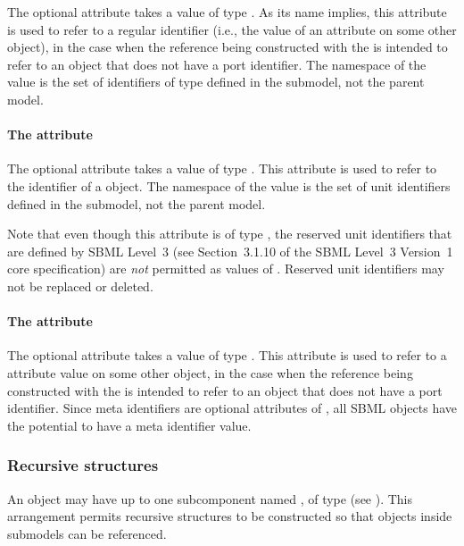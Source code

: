 The optional attribute  takes a value of type
.  As its name implies, this attribute is used to
refer to a regular identifier (i.e., the value of an 
attribute on some other object), in the case when the reference being
constructed with the \SBaseRef is intended to refer to an object that
does not have a port identifier.  The namespace of the 
value is the set of identifiers of type  defined in the
submodel, not the parent model.


\paragraph{The \fixttspace{} attribute}
\label{sbaseref-unitref}

The optional attribute  takes a value of type
.  This attribute is used to refer to the identifier
of a \UnitDefinition object.  The namespace of the 
value is the set of unit identifiers defined in the submodel, not the
parent model.

Note that even though this attribute is of type ,
the reserved unit identifiers that are defined by SBML Level~3 (see
Section~3.1.10 of the SBML Level~3 Version~1 core specification) are
\emph{not} permitted as values of .  Reserved unit
identifiers may not be replaced or deleted.


\paragraph{The \fixttspace{} attribute}
\label{sbaseref-metaidref}

The optional attribute  takes a value of type 
.  This attribute is used to refer to a 
attribute value on some other object, in the case when the reference
being constructed with the \SBaseRef is intended to refer to an object
that does not have a port identifier.  Since meta identifiers are
optional attributes of \SBase, all SBML objects have the potential to
have a meta identifier value.


\subsubsection{Recursive  structures}
\label{sbaseref-recursive-sbaseref}

An \SBaseRef object may have up to one subcomponent named
, of type \SBaseRef (see ).  This
arrangement permits recursive structures to be constructed so that
objects inside submodels can be referenced.

